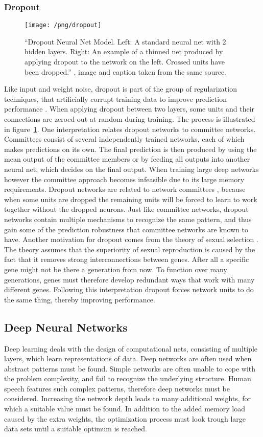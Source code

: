 \subsubsection{Dropout}
\begin{figure}
\texttt{[image: /png/dropout]}
\caption{\enquote{Dropout Neural Net Model. Left: A standard neural net with 2 hidden layers. Right: An example of a thinned net produced by applying dropout to the network on the left. Crossed units have been dropped.} \cite{Srivastava2014}, image and caption taken from the same source.}
\label{fig:Dropout}
\end{figure}
Like input and weight noise, dropout is part of the group of regularization techniques, that artificially corrupt training data to improve prediction performance \cite{Wager2013}. When applying dropout between two layers, some units and their connections are zeroed out at random during training. The process is illustrated in figure~\ref{fig:Dropout}.
One interpretation relates dropout networks to committee networks. Committees consist of several independently trained networks, each of which makes predictions on its own. The final prediction is then produced by using the mean output of the committee members or by feeding all outputs into another neural net, which decides on the final output.
When training large deep networks however the committee approach becomes infeasible due to its large memory requirements. Dropout networks are related to network committees \cite{Srivastava2014}, because when some units are dropped the remaining units will be forced to learn to work together without the dropped neurons. Just like committee networks, dropout networks contain multiple mechanisms to recognize the same pattern, and thus gain some of the prediction robustness that committee networks are known to have.
Another motivation for dropout comes from the theory of sexual selection \cite{Srivastava2014}. The theory assumes that the superiority of sexual reproduction is caused by the fact that it removes strong interconnections between genes. After all a specific gene might not be there a generation from now. To function over many generations, genes must therefore develop redundant ways that work with many different genes.
Following this interpretation dropout forces network units to do the same thing, thereby improving performance.

\subsection{Deep Neural Networks}
Deep learning deals with the design of computational nets, consisting of multiple layers, which learn representations of data. Deep networks are often used when abstract
patterns must be found. Simple networks are often unable to cope with the problem complexity, and fail to recognize the underlying structure. Human speech features such complex patterns, therefore deep networks must be considered. Increasing the network depth leads to many additional weights, for which a suitable value must be found.
In addition to the added memory load caused by the extra weights, the optimization process must look trough large data sets until a suitable optimum is reached.
